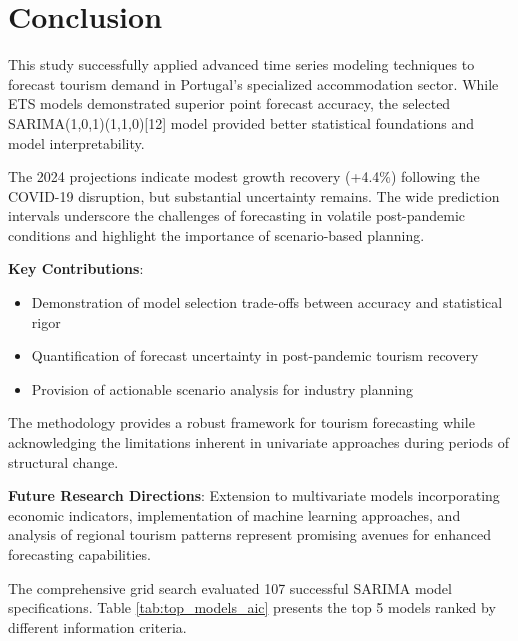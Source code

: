 \documentclass[journal]{IEEEtran}
\begin{document}
\section{Conclusion}

This study successfully applied advanced time series modeling techniques to forecast tourism demand in Portugal's specialized accommodation sector. While ETS models demonstrated superior point forecast accuracy, the selected SARIMA(1,0,1)(1,1,0)[12] model provided better statistical foundations and model interpretability.

The 2024 projections indicate modest growth recovery (+4.4\%) following the COVID-19 disruption, but substantial uncertainty remains. The wide prediction intervals underscore the challenges of forecasting in volatile post-pandemic conditions and highlight the importance of scenario-based planning.

\textbf{Key Contributions}:
\begin{itemize}
    \item Demonstration of model selection trade-offs between accuracy and statistical rigor
    \item Quantification of forecast uncertainty in post-pandemic tourism recovery
    \item Provision of actionable scenario analysis for industry planning
\end{itemize}

The methodology provides a robust framework for tourism forecasting while acknowledging the limitations inherent in univariate approaches during periods of structural change.

\textbf{Future Research Directions}: Extension to multivariate models incorporating economic indicators, implementation of machine learning approaches, and analysis of regional tourism patterns represent promising avenues for enhanced forecasting capabilities.




\newpage

\appendix

The comprehensive grid search evaluated 107 successful SARIMA model specifications. Table \ref{tab:top_models_aic} presents the top 5 models ranked by different information criteria.
\end{document}
